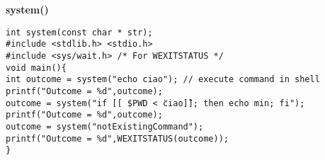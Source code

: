 \begin{flushleft}
\begin{flushleft}
\begin{flushleft}
    \end{flushleft}
    \begin{flushleft}
      \textbf{system()} \par 
      \texttt{int system(const char * str);} \\
      \texttt{\#include <stdlib.h> <stdio.h> \\
              \#include <sys/wait.h> /* For WEXITSTATUS */ \\
              void main()\{ \\
              \halftab int outcome = system("echo ciao"); // execute command in shell \\
              \halftab printf("Outcome = \%d\n",outcome); \\
              \halftab outcome = system("if [[ \$PWD < \"ciao\" ]]; then echo min; fi"); \\
              \halftab printf("Outcome = \%d\n",outcome); \\
              \halftab outcome = system("notExistingCommand"); \\
              \halftab printf("Outcome = \%d\n",WEXITSTATUS(outcome)); \\
              \} }
    \end{flushleft}
  \end{flushleft}

\end{flushleft}
